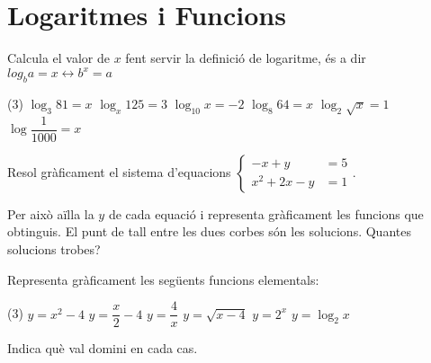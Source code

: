 \documentclass[11pt, a4paper, pdf]{article}
\let\frac\dfrac
\begin{document}
 
 \section{Logaritmes i Funcions}
 \begin{mylist}
 	\item Calcula el valor de $x$ fent servir la definició de logaritme, és a dir
 	$ log_b a = x \leftrightarrow  b^x = a  $
 	
 	\begin{tasks}(3)
 		\task $\log_3 81 = x$
 		\task $\log_x 125 = 3$
 		\task $\log_{10} x = -2$
 		\task $\log_8 64 = x$
 		\task $\log_2 \sqrt{x} = 1$	
 		\task $\log \frac{1}{1000} = x$
 	\end{tasks}
 	
 	\item Resol gràficament el sistema d'equacions 
 	$ \left\{ \begin{array}{rl}
 		-x+y &= 5 \\ x^2+2x-y&=1
 	\end{array} \right.$.
 	
 	 	Per això aïlla la $y$ de cada equació i representa gràficament les funcions que obtinguis. El punt de tall entre les dues corbes són les solucions. Quantes solucions trobes?
 
 	\item Representa gràficament les següents funcions elementals:
 	
 	\begin{tasks}(3)
 		\task $y=x^2-4$
 		\task $y=\frac{x}{2}-4$
 		\task $y=\frac{4}{x}$
 		\task $y=\sqrt{x-4}$
 		\task $y=2^x$	
 		\task $y=\log_2 x$
 	\end{tasks}
 Indica què val domini en cada cas.
  
 \end{mylist}
 
\end{document}
